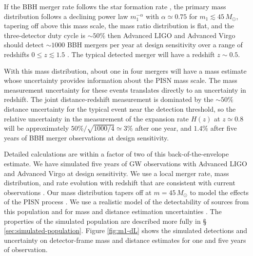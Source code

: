 \documentclass[modern]{aastex62}
\newcommand{\MPISN}{45 \, \MSun{}}
\newcommand{\zpivot}{0.8}
\newcommand{\MSun}{M_\odot}
\begin{document}
If the \ac{BBH} merger rate follows the star formation rate
\citep{Fishbach2018,O1O2Population}, the primary mass distribution follows a
declining power law $m_1^{-\alpha}$ with $\alpha \simeq 0.75$ for $m_1 \lesssim
\MPISN{}$, tapering off above this mass scale, the mass ratio distribution is
flat, and the three-detector duty cycle is $\sim 50\%$ then Advanced LIGO and
Advanced Virgo should detect $\sim 1000$ \ac{BBH} mergers per year at design
sensitivity over a range of redshifts $0 \leq z \lesssim 1.5$
\citep{O1O2Population}.  The typical detected merger will have a redshift $z
\sim 0.5$.

With this mass distribution, about one in four mergers will have a mass estimate
whose uncertainty provides information about the \ac{PISN} mass scale.  The mass
measurement uncertainty for these events translates directly to an uncertainty
in redshift.  The joint distance-redshift measurement is dominated by the $\sim
50\%$ distance uncertainty for the typical event near the detection threshold,
so the relative uncertainty in the measurement of the expansion rate $H(z)$ at
$z \simeq \zpivot{}$ will be approximately $50 \% / \sqrt{1000/4} \simeq 3 \%$
after one year, and $1.4 \%$ after five years of \ac{BBH} merger observations at
design sensitivity.

Detailed calculations are within a factor of two of this back-of-the-envelope
estimate.  We have simulated five years of \ac{GW} observations with Advanced
LIGO and Advanced Virgo at design sensitivity.  We use a local merger rate, mass
distribution, and rate evolution with redshift that are consistent with current
observations \citep{Fishbach2017,Fishbach2018,O1O2Population}.  Our mass
distribution tapers off at $m = \MPISN{}$ to model the effects of the \ac{PISN}
process \citep{Belczynski2016}.  We use a realistic model of the detectability
of sources from this population \citep{GW150914Rate,GW150914RateSupplement} and
for mass and distance estimation uncertainties \citep{Vitale2017}.  The
properties of the simulated population are described more fully in \S
\ref{sec:simulated-population}.  Figure \ref{fig:m1-dL} shows the simulated
detections and uncertainty on detector-frame mass and distance estimates for one
and five years of observation.
\end{document}
